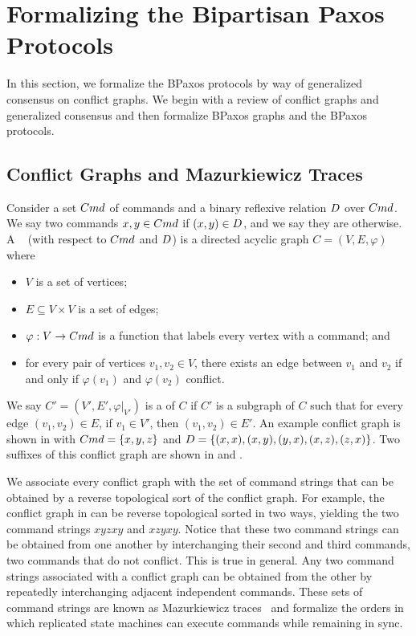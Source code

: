 \section{Formalizing the Bipartisan Paxos Protocols}
In this section, we formalize the BPaxos protocols by way of generalized
consensus on conflict graphs. We begin with a review of conflict graphs and
generalized consensus and then formalize BPaxos graphs and the BPaxos
protocols.

\subsection{Conflict Graphs and Mazurkiewicz Traces}
Consider a set $Cmd$ of commands and a binary reflexive relation $D$
over $Cmd$. We say two commands $x, y \in Cmd$  if $(x, y)
\in D$, and we say they are  otherwise. A
~\cite{mazurkiewicz1995introduction} (with respect to
$Cmd$ and $D$) is a directed acyclic graph $C = (V, E, \varphi)$ where
\begin{itemize}
  \item
    $V$ is a set of vertices;
  \item
    $E \subseteq V \times V$ is a set of edges;
  \item
    $\varphi: V \to Cmd$ is a function that labels every vertex with a command;
    and
  \item
    for every pair of vertices $v_1, v_2 \in V$, there exists an edge between
    $v_1$ and $v_2$ if and only if $\varphi(v_1)$ and $\varphi(v_2)$ conflict.
\end{itemize}

We say $C' = (V', E', \varphi|_{V'})$ is a  of $C$ if $C'$ is a
subgraph of $C$ such that for every edge $(v_1, v_2) \in E$, if $v_1 \in V'$,
then $(v_1, v_2) \in E'$.
%
An example conflict graph is shown in  with $Cmd
= \{x, y, z\}$ and $D = \{(x, x), (x, y), (y, x), (x, z), (z,
x)\}$. Two suffixes of this conflict graph are shown in 
and .



We associate every conflict graph with the set of command strings that can be
obtained by a reverse topological sort of the conflict graph. For example, the
conflict graph in  can be reverse topological
sorted in two ways, yielding the two command strings $xyzxy$ and $xzyxy$.
Notice that these two command strings can be obtained from one another by
interchanging their second and third commands, two commands that do not
conflict. This is true in general. Any two command strings associated with a
conflict graph can be obtained from the other by repeatedly interchanging
adjacent independent commands. These sets of command strings are known as
Mazurkiewicz traces~\cite{mazurkiewicz1985semantics,
mazurkiewicz1995introduction} and formalize the orders in which replicated
state machines can execute commands while remaining in sync.

